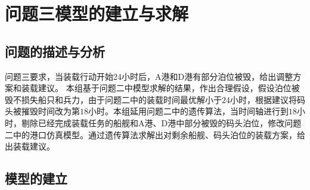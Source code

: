 \documentclass{whutmod}
\begin{document}
     \section{问题三模型的建立与求解}
   	\subsection{问题的描述与分析}
   	问题三要求，当装载行动开始24小时后，A港和D港有部分泊位被毁，给出调整方案和装载建议。
   	本组基于问题二中模型求解的结果，作出合理假设，假设泊位被毁不损失船只和兵力，由于问题二中的装载时间最优解小于$24$小时，根据建议将码头被摧毁时间改为第$18$小时。本组延用问题二中的遗传算法，当时间轴进行到$18$小时，剔除已经完成装载任务的船舰和A港、D港中部分被毁的码头泊位，修改问题二中的港口仿真模型。通过遗传算法求解出对剩余船舰、码头泊位的装载方案，给出装载建议。
  \subsection{模型的建立}
\end{document}

